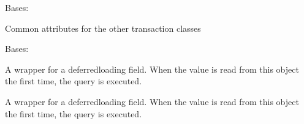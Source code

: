 \documentclass[letterpaper,10pt,english]{sphinxmanual}
\begin{document}
\begin{fulllineitems}
\label{\detokenize{payments:payments.models.AbstractTransaction}}
Bases: 

Common attributes for the other transaction classes

\begin{fulllineitems}
\label{\detokenize{payments:payments.models.AbstractTransaction.Meta}}
Bases: 

\begin{fulllineitems}
\label{\detokenize{payments:payments.models.AbstractTransaction.Meta.abstract}}
\end{fulllineitems}


\end{fulllineitems}


\begin{fulllineitems}
\label{\detokenize{payments:payments.models.AbstractTransaction.amount}}
A wrapper for a deferred\sphinxhyphen{}loading field. When the value is read from this
object the first time, the query is executed.

\end{fulllineitems}


\begin{fulllineitems}
\label{\detokenize{payments:payments.models.AbstractTransaction.balance}}
A wrapper for a deferred\sphinxhyphen{}loading field. When the value is read from this
object the first time, the query is executed.


\end{fulllineitems}
\end{fulllineitems}
\end{document}
